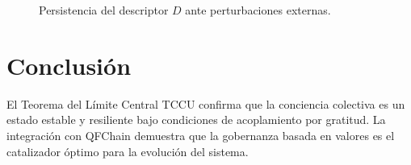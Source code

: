 \begin{figure}[H]
\centering
{}
\caption{Persistencia del descriptor $D$ ante perturbaciones externas.}
\label{fig:supervivencia}
\end{figure}

\section{Conclusión}
El Teorema del Límite Central TCCU confirma que la conciencia colectiva es un estado estable y resiliente bajo condiciones de acoplamiento por gratitud. La integración con QFChain demuestra que la gobernanza basada en valores es el catalizador óptimo para la evolución del sistema.

